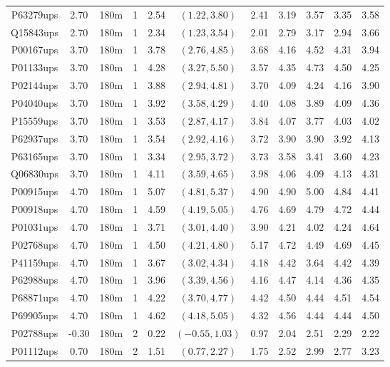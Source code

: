 \begin{landscape}
\begin{longtable}{cccc|cc|ccccc}
  P63279ups & 2.70 & 180m &   1 & 2.54 & $(1.22, 3.80)$ & 2.41 & 3.19 & 3.57 & 3.35 & 3.58 \\ 
  Q15843ups & 2.70 & 180m &   1 & 2.34 & $(1.23, 3.54)$ & 2.01 & 2.79 & 3.17 & 2.94 & 3.66 \\ 
  P00167ups & 3.70 & 180m &   1 & 3.78 & $(2.76, 4.85)$ & 3.68 & 4.16 & 4.52 & 4.31 & 3.94 \\ 
  P01133ups & 3.70 & 180m &   1 & 4.28 & $(3.27, 5.50)$ & 3.57 & 4.35 & 4.73 & 4.50 & 4.25 \\ 
  P02144ups & 3.70 & 180m &   1 & 3.88 & $(2.94, 4.81)$ & 3.70 & 4.09 & 4.24 & 4.16 & 3.90 \\ 
  P04040ups & 3.70 & 180m &   1 & 3.92 & $(3.58, 4.29)$ & 4.40 & 4.08 & 3.89 & 4.09 & 4.36 \\ 
  P15559ups & 3.70 & 180m &   1 & 3.53 & $(2.87, 4.17)$ & 3.84 & 4.07 & 3.77 & 4.03 & 4.02 \\ 
  P62937ups & 3.70 & 180m &   1 & 3.54 & $(2.92, 4.16)$ & 3.72 & 3.90 & 3.90 & 3.92 & 4.13 \\ 
  P63165ups & 3.70 & 180m &   1 & 3.34 & $(2.95, 3.72)$ & 3.73 & 3.58 & 3.41 & 3.60 & 4.23 \\ 
  Q06830ups & 3.70 & 180m &   1 & 4.11 & $(3.59, 4.65)$ & 3.98 & 4.06 & 4.09 & 4.13 & 4.31 \\ 
  P00915ups & 4.70 & 180m &   1 & 5.07 & $(4.81, 5.37)$ & 4.90 & 4.90 & 5.00 & 4.84 & 4.41 \\ 
  P00918ups & 4.70 & 180m &   1 & 4.59 & $(4.19, 5.05)$ & 4.76 & 4.69 & 4.79 & 4.72 & 4.44 \\ 
  P01031ups & 4.70 & 180m &   1 & 3.71 & $(3.01, 4.40)$ & 3.90 & 4.21 & 4.02 & 4.24 & 4.64 \\ 
  P02768ups & 4.70 & 180m &   1 & 4.50 & $(4.21, 4.80)$ & 5.17 & 4.72 & 4.49 & 4.69 & 4.45 \\ 
  P41159ups & 4.70 & 180m &   1 & 3.67 & $(3.02, 4.34)$ & 4.18 & 4.42 & 3.64 & 4.42 & 4.39 \\ 
  P62988ups & 4.70 & 180m &   1 & 3.96 & $(3.39, 4.56)$ & 4.16 & 4.47 & 4.14 & 4.36 & 4.35 \\ 
  P68871ups & 4.70 & 180m &   1 & 4.22 & $(3.70, 4.77)$ & 4.42 & 4.50 & 4.44 & 4.51 & 4.54 \\ 
  P69905ups & 4.70 & 180m &   1 & 4.62 & $(4.18, 5.05)$ & 4.32 & 4.56 & 4.44 & 4.44 & 4.50 \\ 
  P02788ups & -0.30 & 180m &   2 & 0.22 & $(-0.55, 1.03)$ & 0.97 & 2.04 & 2.51 & 2.29 & 2.22 \\ 
  P01112ups & 0.70 & 180m &   2 & 1.51 & $(0.77, 2.27)$ & 1.75 & 2.52 & 2.99 & 2.77 & 3.23 \\ 

\end{longtable}
\end{landscape}
